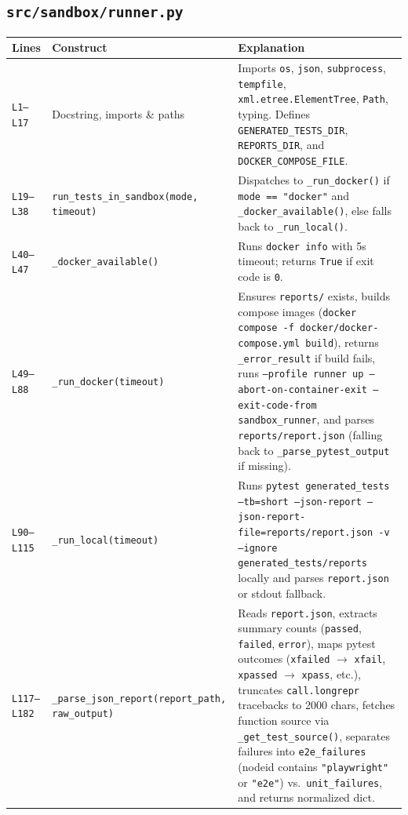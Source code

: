 \documentclass[11pt,a4paper]{article}
\begin{document}
\subsection{\texttt{src/sandbox/runner.py}}
\begin{longtable}{L{1.4cm} L{5.2cm} L{9.0cm}}
\toprule
\textbf{Lines} & \textbf{Construct} & \textbf{Explanation} \\
\midrule
\endhead
\texttt{L1--L17} & Docstring, imports \& paths & Imports \texttt{os}, \texttt{json}, \texttt{subprocess}, \texttt{tempfile}, \texttt{xml.etree.ElementTree}, \texttt{Path}, typing. Defines \texttt{GENERATED\_TESTS\_DIR}, \texttt{REPORTS\_DIR}, and \texttt{DOCKER\_COMPOSE\_FILE}. \\
\texttt{L19--L38} & \texttt{run\_tests\_in\_sandbox(mode, timeout)} & Dispatches to \texttt{\_run\_docker()} if \texttt{mode == "docker"} and \texttt{\_docker\_available()}, else falls back to \texttt{\_run\_local()}. \\
\texttt{L40--L47} & \texttt{\_docker\_available()} & Runs \texttt{docker info} with 5s timeout; returns \texttt{True} if exit code is \texttt{0}. \\
\texttt{L49--L88} & \texttt{\_run\_docker(timeout)} & Ensures \texttt{reports/} exists, builds compose images (\texttt{docker compose -f docker/docker-compose.yml build}), returns \texttt{\_error\_result} if build fails, runs \texttt{--profile runner up --abort-on-container-exit --exit-code-from sandbox\_runner}, and parses \texttt{reports/report.json} (falling back to \texttt{\_parse\_pytest\_output} if missing). \\
\texttt{L90--L115} & \texttt{\_run\_local(timeout)} & Runs \texttt{pytest generated\_tests --tb=short --json-report --json-report-file=reports/report.json -v --ignore generated\_tests/reports} locally and parses \texttt{report.json} or stdout fallback. \\
\texttt{L117--L182} & \texttt{\_parse\_json\_report(report\_path, raw\_output)} & Reads \texttt{report.json}, extracts summary counts (\texttt{passed}, \texttt{failed}, \texttt{error}), maps pytest outcomes (\texttt{xfailed} $\rightarrow$ \texttt{xfail}, \texttt{xpassed} $\rightarrow$ \texttt{xpass}, etc.), truncates \texttt{call.longrepr} tracebacks to 2000 chars, fetches function source via \texttt{\_get\_test\_source()}, separates failures into \texttt{e2e\_failures} (nodeid contains \texttt{"playwright"} or \texttt{"e2e"}) vs.\ \texttt{unit\_failures}, and returns normalized dict. \\

\end{longtable}
\end{document}
